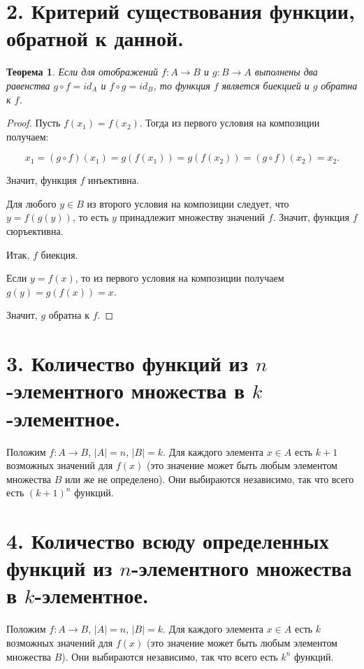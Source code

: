 \documentclass[a4paper, 12pt]{article}
\newtheorem*{theorem}{Теорема}
\begin{document}
\section*{2. Критерий существования функции, обратной к данной.}

\begin{theorem}
    Если для отображений $f : A \to B$ и $g : B \to A$ выполнены два равенства $g \circ f = id_A$ и $f \circ g = id_B$, то функция $f$ является биекцией и $g$ обратна к $f$.
\end{theorem}

\begin{proof}
    Пусть $f(x_1) = f(x_2)$. Тогда из первого условия на композиции
получаем:

\[
    x_1 = (g \circ f)(x_1) = g(f(x_1)) = g(f(x_2)) = (g \circ f)(x_2) = x_2.
\]

Значит, функция $f$ инъективна.

Для любого $y \in B$ из второго условия на композиции следует, что $y = f(g(y))$, то есть $y$ принадлежит множеству значений $f$. Значит, функция $f$ сюръективна.

Итак, $f$ биекция.

Если $y = f(x)$, то из первого условия на композиции получаем $g(y) = g(f(x)) = x$.

Значит, $g$ обратна к $f$.

\end{proof}

\section*{3. Количество функций из $n$-элементного множества в $k$-элементное.}

Положим $f : A \to B$, $|A| = n$, $|B| = k$. Для каждого элемента $x \in A$ есть $k + 1$ возможных значений для $f(x)$ (это значение может быть любым элементом множества $B$ или же не определено). Они выбираются независимо, так что всего есть $(k + 1)^n$ функций.

\section*{4. Количество всюду определенных функций из $n$-элементного множества в $k$-элементное.}

Положим $f : A \to B$, $|A| = n$, $|B| = k$. Для каждого элемента $x \in A$ есть $k$ возможных значений для $f(x)$ (это значение может быть любым элементом множества $B$). Они выбираются независимо, так что всего есть $k^n$ функций.
\end{document}
